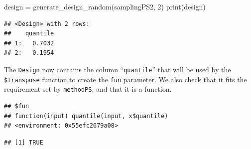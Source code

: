 \documentclass[
]{scrbook}
\newenvironment{Shaded}{\begin{snugshade}}{\end{snugshade}}
\newcommand{\DecValTok}[1]{\textcolor[rgb]{0.00,0.00,0.81}{#1}}
\newcommand{\FunctionTok}[1]{\textcolor[rgb]{0.00,0.00,0.00}{#1}}
\newcommand{\NormalTok}[1]{#1}
\newcommand{\OtherTok}[1]{\textcolor[rgb]{0.56,0.35,0.01}{#1}}
\newcommand{\SpecialCharTok}[1]{\textcolor[rgb]{0.00,0.00,0.00}{#1}}
\renewenvironment{Shaded} {\begin{snugshade}\small} {\end{snugshade}}
\begin{document}
\begin{Shaded}
\begin{Highlighting}[]
\NormalTok{design }\OtherTok{=} \FunctionTok{generate\_design\_random}\NormalTok{(samplingPS2, }\DecValTok{2}\NormalTok{)}
\FunctionTok{print}\NormalTok{(design)}
\end{Highlighting}
\end{Shaded}

\begin{verbatim}
## <Design> with 2 rows:
##    quantile
## 1:   0.7032
## 2:   0.1954
\end{verbatim}

The \texttt{Design} now contains the column ``\texttt{quantile}'' that will be used by the \texttt{\$transpose} function to create the \texttt{fun} parameter.
We also check that it fits the requirement set by \texttt{methodPS}, and that it is a function.

\begin{Shaded}
\end{Shaded}

\begin{verbatim}
## $fun
## function(input) quantile(input, x$quantile)
## <environment: 0x55efc2679a08>
\end{verbatim}

\begin{Shaded}
\end{Shaded}

\begin{verbatim}
## [1] TRUE
\end{verbatim}

\begin{Shaded}
\end{Shaded}
\end{document}

